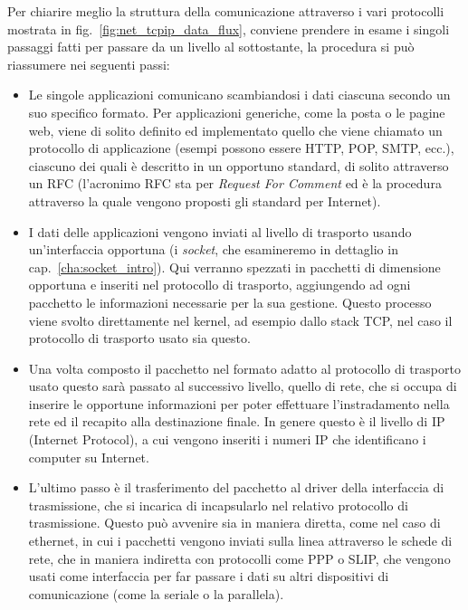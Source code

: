 Per chiarire meglio la struttura della comunicazione attraverso i vari
protocolli mostrata in fig.~\ref{fig:net_tcpip_data_flux}, conviene prendere in
esame i singoli passaggi fatti per passare da un livello al sottostante,
la procedura si può riassumere nei seguenti passi:
\begin{itemize}
\item Le singole applicazioni comunicano scambiandosi i dati ciascuna secondo
  un suo specifico formato. Per applicazioni generiche, come la posta o le
  pagine web, viene di solito definito ed implementato quello che viene
  chiamato un protocollo di applicazione (esempi possono essere HTTP, POP,
  SMTP, ecc.), ciascuno dei quali è descritto in un opportuno standard, di
  solito attraverso un RFC (l'acronimo RFC sta per
   \textit{Request For Comment} ed è la
  procedura attraverso la quale vengono proposti gli standard per Internet).
\item I dati delle applicazioni vengono inviati al livello di trasporto usando
  un'interfaccia opportuna (i \textit{socket}, che esamineremo in dettaglio in
  cap.~\ref{cha:socket_intro}). Qui verranno spezzati in pacchetti di
  dimensione opportuna e inseriti nel protocollo di trasporto, aggiungendo ad
  ogni pacchetto le informazioni necessarie per la sua gestione. Questo
  processo viene svolto direttamente nel kernel, ad esempio dallo stack TCP,
  nel caso il protocollo di trasporto usato sia questo.
\item Una volta composto il pacchetto nel formato adatto al protocollo di
  trasporto usato questo sarà passato al successivo livello, quello di rete,
  che si occupa di inserire le opportune informazioni per poter effettuare
  l'instradamento nella rete ed il recapito alla destinazione finale. In
  genere questo è il livello di IP (Internet Protocol), a cui vengono inseriti
  i numeri IP che identificano i computer su Internet.
\item L'ultimo passo è il trasferimento del pacchetto al driver della
  interfaccia di trasmissione, che si incarica di incapsularlo nel relativo
  protocollo di trasmissione. Questo può avvenire sia in maniera diretta, come
  nel caso di ethernet, in cui i pacchetti vengono inviati sulla linea
  attraverso le schede di rete, che in maniera indiretta con protocolli come
  PPP o SLIP, che vengono usati come interfaccia per far passare i dati su
  altri dispositivi di comunicazione (come la seriale o la parallela).
\end{itemize}


